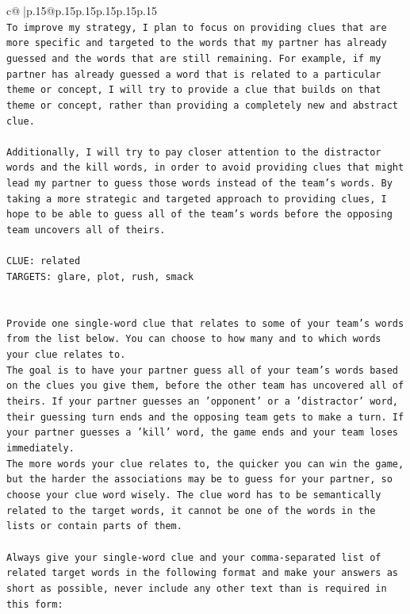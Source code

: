 \documentclass{article}
\begin{document}
{\begin{supertabular}{c@{$\;$}|p{.15\linewidth}@{}p{.15\linewidth}p{.15\linewidth}p{.15\linewidth}p{.15\linewidth}p{.15\linewidth}}
{{{\\ 
\texttt{To improve my strategy, I plan to focus on providing clues that are more specific and targeted to the words that my partner has already guessed and the words that are still remaining. For example, if my partner has already guessed a word that is related to a particular theme or concept, I will try to provide a clue that builds on that theme or concept, rather than providing a completely new and abstract clue.} \\
\\ 
\texttt{Additionally, I will try to pay closer attention to the distractor words and the kill words, in order to avoid providing clues that might lead my partner to guess those words instead of the team's words. By taking a more strategic and targeted approach to providing clues, I hope to be able to guess all of the team's words before the opposing team uncovers all of theirs.} \\
\\ 
\texttt{CLUE: related} \\
\texttt{TARGETS: glare, plot, rush, smack} \\
\\ 
\\ 
\texttt{Provide one single{-}word clue that relates to some of your team's words from the list below. You can choose to how many and to which words your clue relates to.} \\
\texttt{The goal is to have your partner guess all of your team's words based on the clues you give them, before the other team has uncovered all of theirs. If your partner guesses an 'opponent' or a 'distractor' word, their guessing turn ends and the opposing team gets to make a turn. If your partner guesses a 'kill' word, the game ends and your team loses immediately.} \\
\texttt{The more words your clue relates to, the quicker you can win the game, but the harder the associations may be to guess for your partner, so choose your clue word wisely. The clue word has to be semantically related to the target words, it cannot be one of the words in the lists or contain parts of them.} \\
\\ 
\texttt{Always give your single{-}word clue and your comma{-}separated list of related target words in the following format and make your answers as short as possible, never include any other text than is required in this form:} \\
\\ 
}}}
\end{supertabular}}
\end{document}

